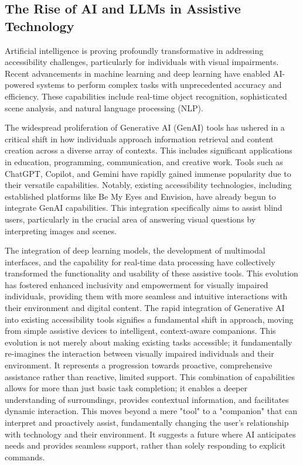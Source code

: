\subsection{The Rise of AI and LLMs in Assistive Technology}
\label{subsec:rise-ai-llm-assistive-tech}

Artificial intelligence is proving profoundly transformative in addressing accessibility challenges, particularly for individuals with visual impairments. Recent advancements in machine learning and deep learning have enabled AI-powered systems to perform complex tasks with unprecedented accuracy and efficiency. These capabilities include real-time object recognition, sophisticated scene analysis, and natural language processing (NLP). \cite{arxiv_visual_impairment}

The widespread proliferation of Generative AI (GenAI) tools has ushered in a critical shift in how individuals approach information retrieval and content creation across a diverse array of contexts. This includes significant applications in education, programming, communication, and creative work. Tools such as ChatGPT, Copilot, and Gemini have rapidly gained immense popularity due to their versatile capabilities. \cite{maitraye2024} Notably, existing accessibility technologies, including established platforms like Be My Eyes and Envision, have already begun to integrate GenAI capabilities. This integration specifically aims to assist blind users, particularly in the crucial area of answering visual questions by interpreting images and scenes. \cite{maitraye2024}

The integration of deep learning models, the development of multimodal interfaces, and the capability for real-time data processing have collectively transformed the functionality and usability of these assistive tools. This evolution has fostered enhanced inclusivity and empowerment for visually impaired individuals, providing them with more seamless and intuitive interactions with their environment and digital content. \cite{arxiv2503} The rapid integration of Generative AI into existing accessibility tools signifies a fundamental shift in approach, moving from simple assistive devices to intelligent, context-aware companions. This evolution is not merely about making existing tasks accessible; it fundamentally re-imagines the interaction between visually impaired individuals and their environment. It represents a progression towards proactive, comprehensive assistance rather than reactive, limited support. This combination of capabilities allows for more than just basic task completion; it enables a deeper understanding of surroundings, provides contextual information, and facilitates dynamic interaction. This moves beyond a mere "tool" to a "companion" that can interpret and proactively assist, fundamentally changing the user's relationship with technology and their environment. It suggests a future where AI anticipates needs and provides seamless support, rather than solely responding to explicit commands.

